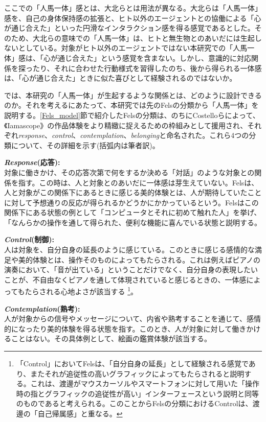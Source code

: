 ここでの「人馬一体」感とは、大北らとは用法が異なる。大北らは「人馬一体」感を、自己の身体保持感の拡張と、ヒト以外のエージェントとの協働による「心が通じ合えた」といった円滑なインタラクション感を得る感覚であるとした。そのため、大北らの意味での「人馬一体」は、ヒトと無生物とのあいだには生起しないとしている。対象がヒト以外のエージェントではない本研究での「人馬一体」感は、「心が通じ合えた」という感覚を含まない。しかし、意識的に対応関係を探ったり、それに合わせた行動様式を習得したのち、後から得られる一体感は、「心が通じ合えた」ときに似た喜びとして経験されるのではないか。

では、本研究の「人馬一体」が生起するような関係とは、どのように設計できるのか。それを考えるにあたって、本研究では先のFelsの分類から「人馬一体」を説明する。\ref{Fels_model}節で紹介したFelsの分類は、のちにCostelloら\cite{Costello2005}によって、《Iamascope》の作品体験をより精緻に捉えるための枠組みとして援用され、それぞれ\textit{response}、\textit{control}、\textit{contemplation}、\textit{belonging}と命名された。これら4つの分類について、その詳細を示す(括弧内は筆者訳)。

\textbf{\textit{Response}(応答):}\\
対象に働きかけ、その応答次第で何をするか決める「対話」のような対象との関係を指す。この時は、人と対象とのあいだに一体感は芽生えていない。Felsは、人と対象がこの関係下にあるときに感じる美的体験とは、人が期待していたことに対して予想通りの反応が得られるかどうかにかかっているという。Felsはこの関係下にある状態の例として「コンピュータとそれに初めて触れた人」を挙げ、「なんらかの操作を通して得られた、便利な機能に喜んでいる状態と説明する。

\textbf{\textit{Control}(制御):}\\
人は対象を、自分自身の延長のように感じている。このときに感じる感情的な満足や美的体験とは、操作そのものによってもたらされる。これは例えばピアノの演奏において、「音が出ている」ということだけでなく、自分自身の表現したいことが、不自由なくピアノを通して体現されていると感じるときの、一体感によってもたらされる心地よさが該当する \footnote{「Control」においてFelsは、「自分自身の延長」として経験される感覚であり、またそれが追従性の高いグラフィックによってもたらされると説明する。これは、渡邊がマウスカーソルやスマートフォンに対して用いた「操作時の指とグラフィックの追従性が高い」インターフェースという説明と同等のものであると考えられる。このことからFelsの分類におけるControlは、渡邊の「自己帰属感」と重なる。}。

\textbf{\textit{Contemplation}(熟考):}\\
人が対象からの信号やメッセージについて、内省や熟考することを通じて、感情的になったり美的体験を得る状態を指す。このとき、人が対象に対して働きかけることはない。その具体例として、絵画の鑑賞体験が該当する。

